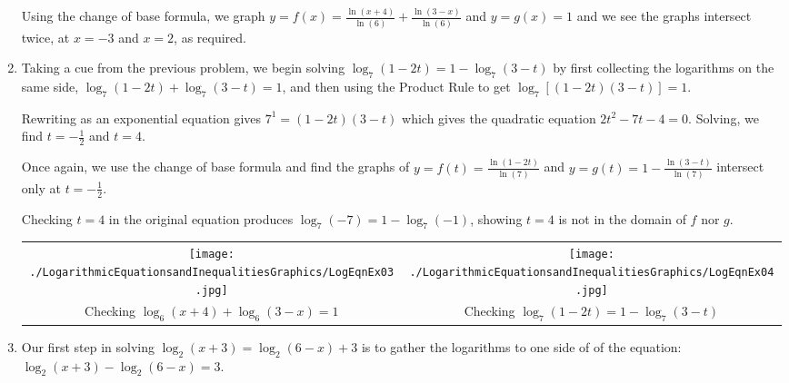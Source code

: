 \documentclass{ximera}
\begin{document}
\begin{example}
\begin{enumerate}
\smallskip

Using the change of base formula, we graph  $y=f(x) =  \frac{\ln(x+4)}{\ln(6)} + \frac{\ln(3-x)}{\ln(6)}$ and $y=g(x) = 1$ and we see the graphs intersect twice, at $x=-3$ and $x=2$, as required.

\item  Taking a cue from the previous problem, we begin solving $\log_{7}(1-2t) = 1 - \log_{7}(3-t)$ by first collecting the logarithms on the same side, $\log_{7}(1-2t) +  \log_{7}(3-t) = 1$, and then using the Product Rule to get $\log_{7}[(1-2t)(3-t)] = 1$.  

\smallskip

Rewriting  as an exponential equation gives $7^{1} = (1-2t)(3-t)$ which gives the quadratic equation $2t^2-7t-4=0$.  Solving, we find  $t = -\frac{1}{2}$ and $t=4$.  

\smallskip

Once again, we use the change of base formula and find the graphs of  $y = f(t) = \frac{\ln(1-2t)}{\ln(7)}$ and $y=g(t) = 1 - \frac{\ln(3-t)}{\ln(7)}$ intersect only at $t=-\frac{1}{2}$.  

\smallskip

Checking $t=4$ in the original equation produces $\log_{7}(-7) = 1 - \log_{7}(-1)$, showing $t=4$ is not in the domain of $f$ nor $g$.

\begin{center}

\begin{tabular}{cc}

\texttt{[image: ./LogarithmicEquationsandInequalitiesGraphics/LogEqnEx03.jpg]} &

\texttt{[image: ./LogarithmicEquationsandInequalitiesGraphics/LogEqnEx04.jpg]}  \\

Checking $\log_{6}(x+4) + \log_{6}(3-x) = 1$
 
 &
 
 Checking $\log_{7}(1-2t) = 1 - \log_{7}(3-t)$
 
\end{tabular}

\end{center}

\item Our first step in solving  $\log_{2}(x+3) = \log_{2}(6-x)+3$ is to gather the logarithms to one side of of the equation: $\log_{2}(x+3) - \log_{2}(6-x) = 3$.


\smallskip



\end{enumerate}
\end{example}
\end{document}
